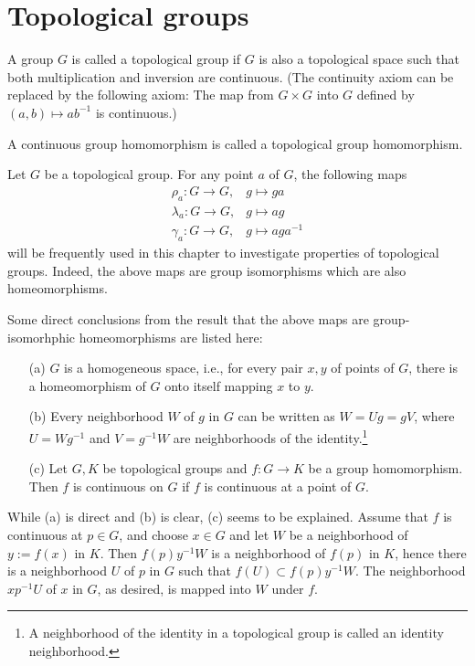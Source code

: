 \section{Topological groups}

\begin{defi}
    A group $G$ is called a topological group if $G$ is also a topological space such that both multiplication and inversion are continuous.
    (The continuity axiom can be replaced by the following axiom: The map from $G\times G$ into $G$ defined by $(a, b)\mapsto ab^{-1}$ is continuous.)
\end{defi}
\begin{rmk}
    A continuous group homomorphism is called a topological group homomorphism.
\end{rmk}

Let $G$ be a topological group.
For any point $a$ of $G$, the following maps
\begin{eqnarray*}
    \rho_a: G\rightarrow G,& g\mapsto ga\\
    \lambda_a: G\rightarrow G,& g\mapsto ag\\
    \gamma_a: G\rightarrow G,& g\mapsto aga^{-1}
\end{eqnarray*}
will be frequently used in this chapter to investigate properties of topological groups.
Indeed, the above maps are group isomorphisms which are also homeomorphisms.
\begin{obs}
    Some direct conclusions from the result that the above maps are group-isomorhphic homeomorphisms are listed here:
    \begin{enumerate}
        \item[(a)]
        {
            $G$ is a homogeneous space, i.e., for every pair $x, y$ of points of $G$, there is a homeomorphism of $G$ onto itself mapping $x$ to $y$.
        }
        \item[(b)]
        {
            Every neighborhood $W$ of $g$ in $G$ can be written as $W=Ug=gV$, where $U=Wg^{-1}$ and $V=g^{-1}W$ are neighborhoods of the identity.\footnote{A neighborhood of the identity in a topological group is called an identity neighborhood.}
        }
        \item[(c)]
        {
            Let $G, K$ be topological groups and $f: G\rightarrow K$ be a group homomorphism.
            Then $f$ is continuous on $G$ if $f$ is continuous at a point of $G$.
        }
    \end{enumerate}
    While (a) is direct and (b) is clear, (c) seems to be explained.
    Assume that $f$ is continuous at $p\in G$, and choose $x\in G$ and let $W$ be a neighborhood of $y:=f(x)$ in $K$.
    Then $f(p)y^{-1}W$ is a neighborhood of $f(p)$ in $K$, hence there is a neighborhood $U$ of $p$ in $G$ such that $f(U)\subset f(p)y^{-1}W$.
    The neighborhood $xp^{-1}U$ of $x$ in $G$, as desired, is mapped into $W$ under $f$.
\end{obs}

